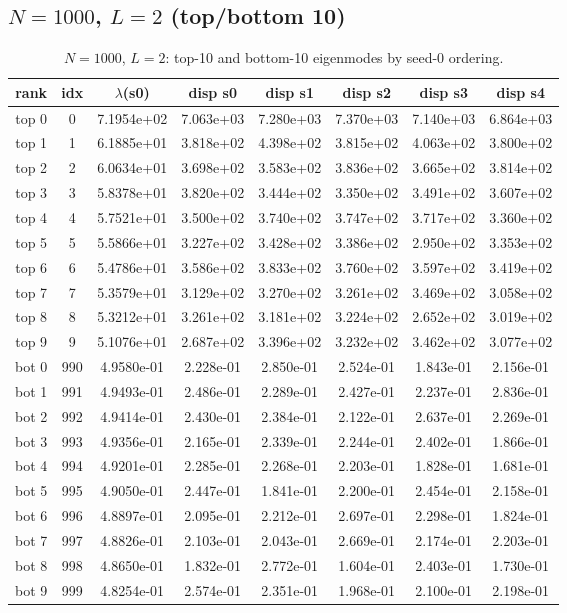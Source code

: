\subsection{$N=1000$, $L=2$ (top/bottom 10)}
\begin{table}[H]
\centering
\caption{$N=1000$, $L=2$: top-10 and bottom-10 eigenmodes by seed-0 ordering.}
\label{tab:permode-N1000-L2}
\begin{tabular}{c c c c c c c c}
\toprule
rank & idx & $\lambda$(s0) & disp s0 & disp s1 & disp s2 & disp s3 & disp s4 \\
\midrule
top 0 & 0 & 7.1954e+02 & 7.063e+03 & 7.280e+03 & 7.370e+03 & 7.140e+03 & 6.864e+03 \\
top 1 & 1 & 6.1885e+01 & 3.818e+02 & 4.398e+02 & 3.815e+02 & 4.063e+02 & 3.800e+02 \\
top 2 & 2 & 6.0634e+01 & 3.698e+02 & 3.583e+02 & 3.836e+02 & 3.665e+02 & 3.814e+02 \\
top 3 & 3 & 5.8378e+01 & 3.820e+02 & 3.444e+02 & 3.350e+02 & 3.491e+02 & 3.607e+02 \\
top 4 & 4 & 5.7521e+01 & 3.500e+02 & 3.740e+02 & 3.747e+02 & 3.717e+02 & 3.360e+02 \\
top 5 & 5 & 5.5866e+01 & 3.227e+02 & 3.428e+02 & 3.386e+02 & 2.950e+02 & 3.353e+02 \\
top 6 & 6 & 5.4786e+01 & 3.586e+02 & 3.833e+02 & 3.760e+02 & 3.597e+02 & 3.419e+02 \\
top 7 & 7 & 5.3579e+01 & 3.129e+02 & 3.270e+02 & 3.261e+02 & 3.469e+02 & 3.058e+02 \\
top 8 & 8 & 5.3212e+01 & 3.261e+02 & 3.181e+02 & 3.224e+02 & 2.652e+02 & 3.019e+02 \\
top 9 & 9 & 5.1076e+01 & 2.687e+02 & 3.396e+02 & 3.232e+02 & 3.462e+02 & 3.077e+02 \\
\midrule
bot 0 & 990 & 4.9580e-01 & 2.228e-01 & 2.850e-01 & 2.524e-01 & 1.843e-01 & 2.156e-01 \\
bot 1 & 991 & 4.9493e-01 & 2.486e-01 & 2.289e-01 & 2.427e-01 & 2.237e-01 & 2.836e-01 \\
bot 2 & 992 & 4.9414e-01 & 2.430e-01 & 2.384e-01 & 2.122e-01 & 2.637e-01 & 2.269e-01 \\
bot 3 & 993 & 4.9356e-01 & 2.165e-01 & 2.339e-01 & 2.244e-01 & 2.402e-01 & 1.866e-01 \\
bot 4 & 994 & 4.9201e-01 & 2.285e-01 & 2.268e-01 & 2.203e-01 & 1.828e-01 & 1.681e-01 \\
bot 5 & 995 & 4.9050e-01 & 2.447e-01 & 1.841e-01 & 2.200e-01 & 2.454e-01 & 2.158e-01 \\
bot 6 & 996 & 4.8897e-01 & 2.095e-01 & 2.212e-01 & 2.697e-01 & 2.298e-01 & 1.824e-01 \\
bot 7 & 997 & 4.8826e-01 & 2.103e-01 & 2.043e-01 & 2.669e-01 & 2.174e-01 & 2.203e-01 \\
bot 8 & 998 & 4.8650e-01 & 1.832e-01 & 2.772e-01 & 1.604e-01 & 2.403e-01 & 1.730e-01 \\
bot 9 & 999 & 4.8254e-01 & 2.574e-01 & 2.351e-01 & 1.968e-01 & 2.100e-01 & 2.198e-01 \\
\bottomrule
\end{tabular}
\end{table}
